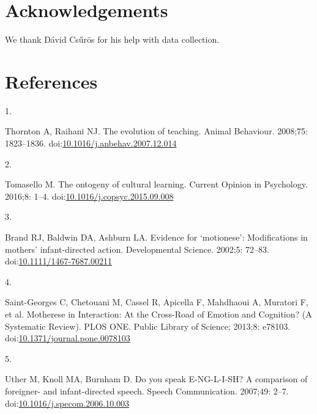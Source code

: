 \documentclass[
  english,
  man,floatsintext]{apa6}
\newlength{\cslhangindent}
\newlength{\csllabelwidth}
\newlength{\cslentryspacingunit} %
\newenvironment{CSLReferences}[2] %
 {%
  \setlength{\parindent}{0pt}
  \ifodd #1
  \let\oldpar\par
  \def\par{\hangindent=\cslhangindent\oldpar}
  \fi
  \setlength{\parskip}{#2\cslentryspacingunit}
 }%
 {}
\newcommand{\CSLLeftMargin}[1]{\parbox[t]{\csllabelwidth}{#1}}
\newcommand{\CSLRightInline}[1]{\parbox[t]{\linewidth - \csllabelwidth}{#1}\break}
\begin{document}
\hypertarget{acknowledgements}{%
\section{Acknowledgements}\label{acknowledgements}}

We thank Dávid Csűrös for his help with data collection.

\hypertarget{references}{%
\section{References}\label{references}}

\begingroup
\setlength{\parindent}{-0in}
\setlength{\leftskip}{0in}

\hypertarget{refs}{}
\begin{CSLReferences}{0}{0}
\leavevmode{}%
\CSLLeftMargin{1. }
\CSLRightInline{Thornton A, Raihani NJ. The evolution of teaching. Animal Behaviour. 2008;75: 1823--1836. doi:\href{https://doi.org/10.1016/j.anbehav.2007.12.014}{10.1016/j.anbehav.2007.12.014}}

\leavevmode{}%
\CSLLeftMargin{2. }
\CSLRightInline{Tomasello M. The ontogeny of cultural learning. Current Opinion in Psychology. 2016;8: 1--4. doi:\href{https://doi.org/10.1016/j.copsyc.2015.09.008}{10.1016/j.copsyc.2015.09.008}}

\leavevmode{}%
\CSLLeftMargin{3. }
\CSLRightInline{Brand RJ, Baldwin DA, Ashburn LA. Evidence for {`motionese'}: Modifications in mothers' infant-directed action. Developmental Science. 2002;5: 72--83. doi:\href{https://doi.org/10.1111/1467-7687.00211}{10.1111/1467-7687.00211}}

\leavevmode{}%
\CSLLeftMargin{4. }
\CSLRightInline{Saint-Georges C, Chetouani M, Cassel R, Apicella F, Mahdhaoui A, Muratori F, et al. Motherese in {Interaction}: {At} the {Cross}-{Road} of {Emotion} and {Cognition}? ({A Systematic Review}). PLOS ONE. {Public Library of Science}; 2013;8: e78103. doi:\href{https://doi.org/10.1371/journal.pone.0078103}{10.1371/journal.pone.0078103}}

\leavevmode{}%
\CSLLeftMargin{5. }
\CSLRightInline{Uther M, Knoll MA, Burnham D. Do you speak {E}-{NG}-{L}-{I}-{SH}? {A} comparison of foreigner- and infant-directed speech. Speech Communication. 2007;49: 2--7. doi:\href{https://doi.org/10.1016/j.specom.2006.10.003}{10.1016/j.specom.2006.10.003}}


\end{CSLReferences}
\end{document}
